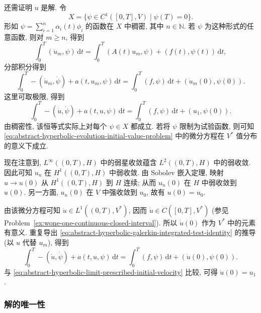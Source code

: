 还需证明 $u$ 是解. 令
\begin{equation}\label{eq:abstract-hyperbolic-terminal-zero-test-space}
X=\{\psi\in C^1([0,T],V)\mid\psi(T)=0\}.
\end{equation}
形如 $\psi=\sum_{i=1}^n\alpha_i(t)\phi_i$ 的函数在 $X$ 中稠密, 其中 $n\in\mathbb{N}$. 若 $\psi$ 为这种形式的任意函数, 则对 $m\geq n$, 得到
\begin{equation}\label{eq:abstract-hyperbolic-galerkin-test-identity}
\int_0^T(\ddot u_m,\psi)\,\mathrm{d}t=\int_0^T(A(t)u_m,\psi)+(f(t),\psi(t))\,\mathrm{d}t,
\end{equation}
分部积分得到
\begin{equation}\label{eq:abstract-hyperbolic-galerkin-integrated-test-identity}
\int_0^T-(\dot u_m,\dot\psi)+a(t,u_m,\psi)\,\mathrm{d}t=\int_0^T(f,\psi)\,\mathrm{d}t+(\dot u_m(0),\psi(0)).
\end{equation}
这里可取极限, 得到
\begin{equation}\label{eq:abstract-hyperbolic-limit-prescribed-initial-velocity}
\int_0^T-(\dot u,\dot\psi)+a(t,u,\psi)\,\mathrm{d}t=\int_0^T(f,\psi)\,\mathrm{d}t+(u_1,\psi(0)).
\end{equation}
由稠密性, 该恒等式实际上对每个 $\psi\in X$ 都成立. 若将 $\psi$ 限制为试验函数, 则可知 \eqref{eq:abstract-hyperbolic-evolution-initial-value-problem} 中的微分方程在 $V^*$ 值分布的意义下成立.\par 现在注意到, $L^\infty((0,T),H)$ 中的弱星收敛蕴含 $L^2((0,T),H)$ 中的弱收敛. 因此可知 $u_n$ 在 $H^1((0,T),H)$ 中弱收敛. 由 Sobolev 嵌入定理, 映射 $u\to u(0)$ 从 $H^1((0,T),H)$ 到 $H$ 连续; 从而 $u_n(0)$ 在 $H$ 中弱收敛到 $u(0)$. 另一方面, $u_n(0)$ 在 $V$ 中强收敛到 $u_0$, 故有 $u(0)=u_0$.

由该微分方程可知 $\ddot u\in L^1((0,T),V^*)$, 因而 $\dot u\in C([0,T],V^*)$ (参见 Problem~\ref{ex:wone-one-continuous-closed-interval}). 所以 $\dot u(0)$ 作为 $V^*$ 中的元素有意义. 重复导出 \eqref{eq:abstract-hyperbolic-galerkin-integrated-test-identity} 的推导 (以 $u$ 代替 $u_m$), 得到
\begin{equation}\label{eq:abstract-hyperbolic-limit-solution-initial-velocity}
\int_0^T-(\dot u,\dot\psi)+a(t,u,\psi)\,\mathrm{d}t=\int_0^T(f,\psi)\,\mathrm{d}t+(\dot u(0),\psi(0)).
\end{equation}
与 \eqref{eq:abstract-hyperbolic-limit-prescribed-initial-velocity} 比较, 可得 $\dot u(0)=u_1$.

\subsubsection{解的唯一性}\label{subsec:hyperbolic-solution-uniqueness}

